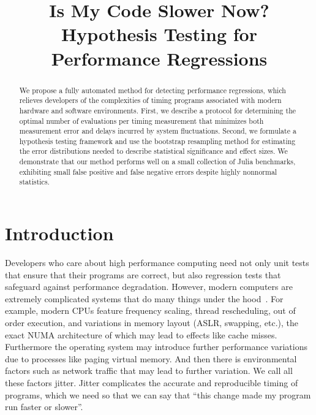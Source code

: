 \documentclass[conference]{IEEEtran}
\begin{document}
\newcommand{\TODO}[1]{\todo[inline]{#1}}
\newcommand{\TODOFIG}[1]{\missingfigure{#1}}

\title{Is My Code Slower Now? Hypothesis Testing for Performance Regressions}

\author{
}

\maketitle

\begin{abstract}
We propose a fully automated method for detecting performance regressions,
which relieves developers of the complexities of timing programs associated with
modern hardware and software environments.
First, we describe a protocol for determining the optimal number of evaluations
per timing measurement that minimizes both measurement error
and delays incurred by system fluctuations.
Second, we formulate a hypothesis testing framework and use the bootstrap
resampling method for estimating the error distributions needed to describe
statistical significance and effect sizes.
We demonstrate that our method performs well on a small collection of Julia benchmarks,
exhibiting small false positive and false negative errors despite highly nonnormal statistics.
\end{abstract}

\IEEEpeerreviewmaketitle

\section{Introduction}

Developers who care about high performance computing need not only unit tests that
ensure that their programs are correct, but also regression tests that safeguard
against performance degradation. However, modern computers are extremely complicated
systems that do many things under the hood~\cite{HP5e}.
For example, modern CPUs feature frequency scaling, thread rescheduling,
out of order execution,
and variations in memory layout (ASLR, swapping, etc.), the exact NUMA architecture
of which may lead to effects like cache misses.
Furthermore the operating system may introduce further performance variations
due to processes like paging virtual memory.
And then there is environmental factors such as network traffic that may lead to
further variation. We call all these factors jitter.
Jitter complicates the accurate and reproducible timing of programs, which we
need so that we can say that ``this change made my program run faster or slower''.
\end{document}
